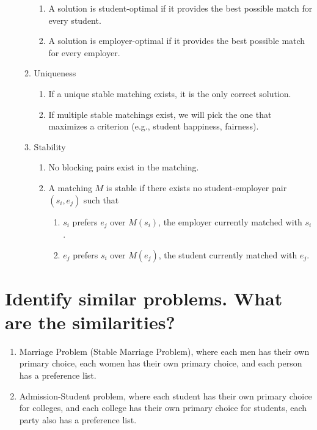 \documentclass[12pt]{article}
\begin{document}
\begin{enumerate}
\begin{enumerate}
\begin{enumerate}
                    \item A solution is student-optimal if it provides the best possible match for every student.
                    \item A solution is employer-optimal if it provides the best possible match for every employer.
                \end{enumerate}
            \item Uniqueness
                \begin{enumerate}
                    \item If a unique stable matching exists, it is the only correct solution.
                    \item If multiple stable matchings exist, we will pick the one that maximizes a criterion (e.g., student happiness, fairness).
                \end{enumerate}
            \item Stability
                \begin{enumerate}
                    \item No blocking pairs exist in the matching.
                    \item A matching $M$ is stable if there exists no student-employer pair 
                    $(s_i, e_j)$ such that
                    \begin{enumerate}
                        \item $s_i$ prefers $e_j$ over $M(s_i)$, the employer currently matched with $s_i$.
                        \item $e_j$ prefers $s_i$ over $M(e_j)$, the student currently matched with $e_j$.
                    \end{enumerate}
                \end{enumerate}
        \end{enumerate}
   \end{enumerate}

\section{Identify similar problems. What are the similarities?}
   \begin{enumerate}
    \item Marriage Problem (Stable Marriage Problem), where each men has their own primary choice,
    each women has their own primary choice, and each person has a preference list.
    \item Admission-Student problem, where each student has their own primary choice for colleges,
    and each college has their own primary choice for students, each party also has a preference list.
   \end{enumerate}
\end{document}
